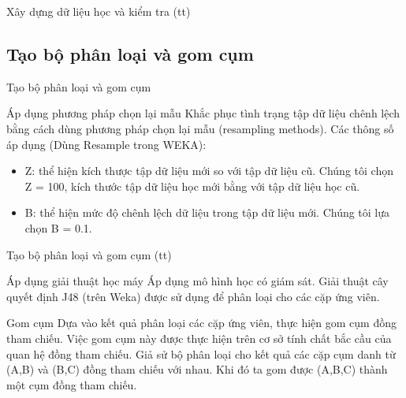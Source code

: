 \documentclass{beamer}
\begin{document}
	\begin{frame}{Xây dựng dữ liệu học và kiểm tra (tt)}		
		\begin{table}[]		
		\parbox{\textwidth}{
			\centering
			\fontsize{5pt}{7}\selectfont			
				
			\caption{Các đặc trưng được sử dụng trong hệ thống (tt)}
		}
		\end{table}
	\end{frame}

	\subsection{Tạo bộ phân loại và gom cụm}
	\begin{frame}{Tạo bộ phân loại và gom cụm}		
		\begin{block}{Áp dụng phương pháp chọn lại mẫu}
			Khắc phục tình trạng tập dữ liệu chênh lệch bằng cách dùng phương pháp chọn lại mẫu (resampling methods).
			Các thông số áp dụng (Dùng Resample trong WEKA):
			\begin{itemize}
				\item{Z: thể hiện kích thược tập dữ liệu mới so với tập dữ liệu cũ. Chúng tôi chọn Z = 100, kích thước tập dữ liệu học mới bằng với tập dữ liệu học cũ.}
				\item{B: thể hiện mức độ chênh lệch dữ liệu trong tập dữ liệu mới. Chúng tôi lựa chọn B = 0.1.}
			\end{itemize}
		\end{block}
	\end{frame}

	\begin{frame}{Tạo bộ phân loại và gom cụm (tt)}		
		\begin{block}{Áp dụng giải thuật học máy}
			Áp dụng mô hình học có giám sát. Giải thuật cây quyết định J48 (trên Weka) được sử dụng để phân loại cho các cặp ứng viên.
		\end{block}			

		\begin{block}{Gom cụm}
			Dựa vào kết quả phân loại các cặp ứng viên, thực hiện gom cụm đồng tham chiếu. Việc gom cụm này được thực hiện trên cơ sở tính chất bắc cầu của quan hệ đồng tham chiếu. Giả sử bộ phân loại cho kết quả các cặp cụm danh từ (A,B) và (B,C) đồng tham chiếu với nhau. Khi đó ta gom được (A,B,C) thành một cụm đồng tham chiếu.
		\end{block}
	\end{frame}
\end{document}
